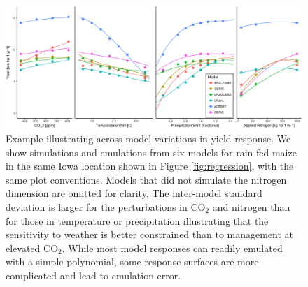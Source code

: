 \documentclass[preprint, 5p, times, twocolumn]{elsarticle}
\begin{document}
\begin{figure}[!h]
\centering
    \includegraphics[width=0.95\linewidth]{regression_model.png}
    \caption{Example illustrating across-model variations in yield response. We show simulations and emulations from six models for rain-fed maize in the same Iowa location shown in Figure \ref{fig:regression}, with the same plot conventions. Models that did not simulate the nitrogen dimension are omitted for clarity. The inter-model standard deviation is larger for the perturbations in CO$_2$ and nitrogen than for those in temperature or precipitation illustrating that the sensitivity to weather is better constrained than to management at elevated CO$_2$. While most model responses can readily emulated with a simple polynomial, some response surfaces are more complicated and lead to emulation error.}
   \label{fig:regression_iowa}
\end{figure}
\end{document}
